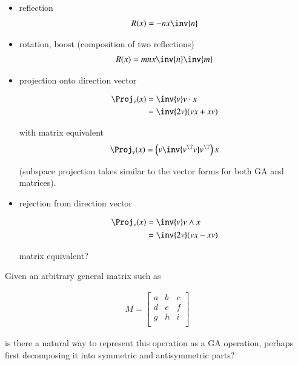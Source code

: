 \begin{itemize}
\item reflection
\begin{align*}
R(x) = -n x \inv{n}
\end{align*}

\item rotation, boost (composition of two reflections)
\begin{align*}
R(x)
&= m n x \inv{n} \inv{m} \\
\end{align*}

\item projection onto direction vector

\begin{align*}
\Proj_v(x) 
&= \inv{v} v \cdot x \\
&= \inv{2v} (v x + x v) \\
\end{align*}

with matrix equivalent
\begin{align*}
\Proj_v(x) = \left(v \inv{v^\T v} v^\T \right) x
\end{align*}

(subspace projection takes similar to the vector forms for both GA and matrices).

\item rejection from direction vector

\begin{align*}
\Proj_v(x) 
&= \inv{v} v \wedge x \\
&= \inv{2v} (v x - x v) \\
\end{align*}

matrix equivalent?

\end{itemize}

Given an arbitrary general matrix such as 

\begin{align*}
M = 
\begin{bmatrix}
a & b & c \\
d & e & f \\
g & h & i \\
\end{bmatrix}
\end{align*}

is there a natural way to represent this operation as a GA operation, perhaps first decomposing it into symmetric and antisymmetric parts?

